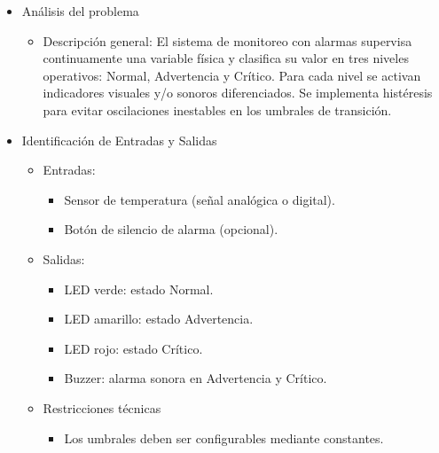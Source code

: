 \begin{itemize}
    \item Análisis del problema
        \begin{itemize}
        
            \item Descripción general:
            El sistema de monitoreo con alarmas supervisa continuamente una variable física y clasifica su valor en tres niveles operativos: Normal, Advertencia y Crítico. Para cada nivel se activan indicadores visuales y/o sonoros diferenciados. Se implementa histéresis para evitar oscilaciones inestables en los umbrales de transición.

        \end{itemize} 

    \item Identificación de Entradas y Salidas
        \begin{itemize}
            
            \item Entradas:
                \begin{itemize}
                    \item  Sensor de temperatura (señal analógica o digital).

                    \item Botón de silencio de alarma (opcional).                   
                \end{itemize}
            
            \item Salidas:
                \begin{itemize}
                    \item  LED verde: estado Normal.
                    
                    \item LED amarillo: estado Advertencia.    
                    \item LED rojo: estado Crítico. 

                    \item Buzzer: alarma sonora en Advertencia y Crítico.
                    
                \end{itemize}

    \item Restricciones técnicas
        \begin{itemize}
            \item Los umbrales deben ser configurables mediante constantes.


\end{itemize}
\end{itemize}
\end{itemize}
